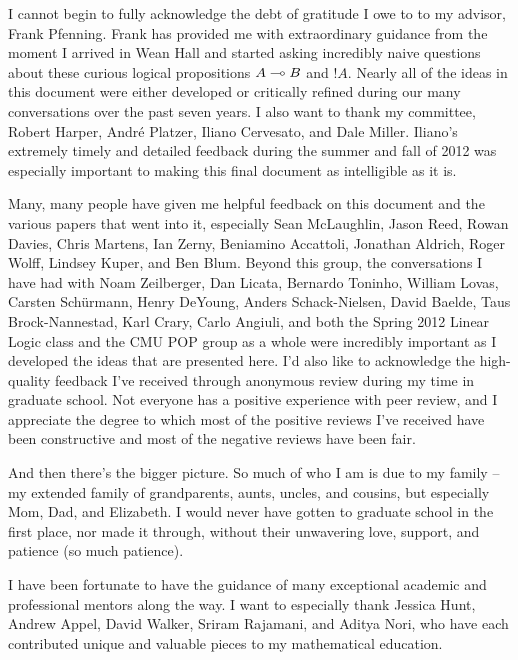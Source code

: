 \documentclass[12pt]{cmuthesis}
\begin{document}
\begin{acknowledgments}
  I cannot begin to fully acknowledge the debt of gratitude I owe to
  to my advisor, Frank Pfenning. Frank has provided me with
  extraordinary guidance from the moment I arrived in Wean Hall and
  started asking incredibly naive questions about these curious
  logical propositions $A \multimap B$ and ${!}A$. Nearly all of the
  ideas in this document were either developed or critically refined
  during our many conversations over the past seven years. I also want
  to thank my committee, Robert Harper, Andr{\'e} Platzer, Iliano
  Cervesato, and Dale Miller. Iliano's extremely timely and detailed
  feedback during the summer and fall of 2012 was especially important
  to making this final document as intelligible as it is.

  Many, many people have given me helpful feedback on this document
  and the various papers that went into it, especially Sean
  McLaughlin, Jason Reed, Rowan Davies, Chris Martens, Ian Zerny,
  Beniamino Accattoli, Jonathan Aldrich, Roger Wolff, Lindsey Kuper,
  and Ben Blum.  Beyond this group, the conversations I have had with
  Noam Zeilberger, Dan Licata, Bernardo Toninho, William Lovas,
  Carsten Sch{\"u}rmann, Henry DeYoung, Anders Schack-Nielsen, David
  Baelde, Taus Brock-Nannestad, Karl Crary, Carlo Angiuli, and both
  the Spring 2012 Linear Logic class and the CMU POP group as a whole
  were incredibly important as I developed the ideas that are
  presented here.  I'd also like to acknowledge the high-quality
  feedback I've received through anonymous review during my time in
  graduate school. Not everyone has a positive experience with peer
  review, and I appreciate the degree to which most of the positive
  reviews I've received have been constructive and most of the
  negative reviews have been fair.

  And then there's the bigger picture.  So much of who I am is due to
  my family -- my extended family of grandparents, aunts, uncles, and
  cousins, but especially Mom, Dad, and Elizabeth. I would never have
  gotten to graduate school in the first place, nor made it through,
  without their unwavering love, support, and patience (so much
  patience).

  I have been fortunate to have the guidance of many exceptional
  academic and professional mentors along the way. I want to
  especially thank Jessica Hunt, Andrew Appel, David Walker, Sriram
  Rajamani, and Aditya Nori, who have each contributed unique and
  valuable pieces to my mathematical education.


\end{acknowledgments}
\end{document}
